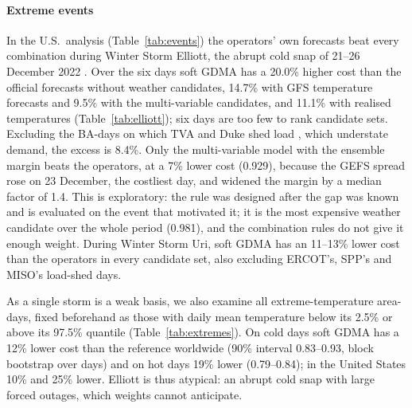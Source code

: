 \paragraph{Extreme events}
In the U.S.\ analysis (Table~\ref{tab:events}) the operators' own forecasts beat every combination during Winter Storm Elliott, the abrupt cold snap of 21--26 December 2022 \citep{FERCNERC2023}.
Over the six days soft GDMA has a 20.0\% higher cost than the official forecasts without weather candidates, 14.7\% with GFS temperature forecasts and 9.5\% with the multi-variable candidates, and 11.1\% with realised temperatures (Table~\ref{tab:elliott}); six days are too few to rank candidate sets.
Excluding the BA-days on which TVA and Duke shed load \citep{FERCNERC2023}, which understate demand, the excess is 8.4\%.
Only the multi-variable model with the ensemble margin beats the operators, at a 7\% lower cost (0.929), because the GEFS spread rose on 23 December, the costliest day, and widened the margin by a median factor of 1.4.
This is exploratory: the rule was designed after the gap was known and is evaluated on the event that motivated it; it is the most expensive weather candidate over the whole period (0.981), and the combination rules do not give it enough weight.
During Winter Storm Uri, soft GDMA has an 11--13\% lower cost than the operators in every candidate set, also excluding ERCOT's, SPP's and MISO's load-shed days.

\begin{table}[t]
\centering
\caption{Winter Storm Elliott (21--26 December 2022, 46 U.S.\ balancing authorities): commitment cost relative to the operators' official day-ahead forecasts, by candidate set ($W=28$), and in the main set without the BA-days on which load was shed. Lower is better: values below 1 mean a lower cost than the benchmark.}\label{tab:elliott}
\footnotesize
\setlength{\tabcolsep}{4pt}

\end{table}

As a single storm is a weak basis, we also examine all extreme-temperature area-days, fixed beforehand as those with daily mean temperature below its 2.5\% or above its 97.5\% quantile (Table~\ref{tab:extremes}).
On cold days soft GDMA has a 12\% lower cost than the reference worldwide (90\% interval 0.83--0.93, block bootstrap over days) and on hot days 19\% lower (0.79--0.84); in the United States 10\% and 25\% lower.
Elliott is thus atypical: an abrupt cold snap with large forced outages, which weights cannot anticipate.

